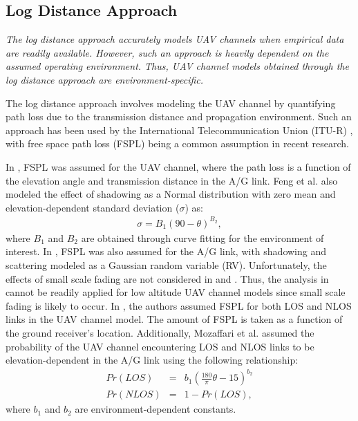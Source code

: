 \subsection{Log Distance Approach} \label{lit_review_log_dist_approach}

\begin{summary}\emph{
\emph{The log distance approach accurately models UAV channels when empirical data are readily available. However, such an approach is heavily dependent on the assumed operating environment. Thus, UAV channel models obtained through the log distance approach are environment-specific.}
}
\end{summary}

The log distance approach involves modeling the UAV channel by quantifying path loss due to the transmission distance and propagation environment. Such an approach has been used by the International Telecommunication Union (ITU-R) \cite{ITUR2013}, with free space path loss (FSPL) \cite{chandrasekharan2016designing} being a common assumption in recent research.

In \cite{feng2006path}, FSPL was assumed for the UAV channel, where the path loss is a function of the elevation angle and transmission distance in the A/G link. Feng et al. \cite{feng2006path} also modeled the effect of shadowing as a Normal distribution with zero mean and elevation-dependent standard deviation ($\sigma$) as:
\begin{eqnarray}
\sigma=B_1({90-\theta})^{B_2},
\end{eqnarray}
where $B_1$ and $B_2$ are obtained through curve fitting for the environment of interest. In \cite{al2014optimal}, FSPL was also assumed for the A/G link, with shadowing and scattering modeled as a Gaussian random variable (RV). Unfortunately, the effects of small scale fading are not considered in \cite{feng2006path} and \cite{al2014optimal}. Thus, the analysis in \cite{feng2006path,al2014optimal} cannot be readily applied for low altitude UAV channel models since small scale fading is likely to occur. In \cite{mozaffari2017wireless}, the authors assumed FSPL for both LOS and NLOS links in the UAV channel model. The amount of FSPL is taken as a function of the ground receiver's location. Additionally, Mozaffari et al. \cite{mozaffari2017wireless} assumed the probability of the UAV channel encountering LOS and NLOS links to be elevation-dependent in the A/G link using the following relationship:
\begin{eqnarray}
Pr(LOS) & = & b_1 \left(\frac{180}{\pi}\theta - 15\right)^{b_2} \\
Pr(NLOS) & = & 1- Pr(LOS),
\end{eqnarray}
where $b_1$ and $b_2$ are environment-dependent constants. 

